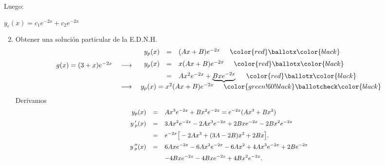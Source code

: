 \documentclass[9pt]{beamer}
\begin{document}
\begin{frame}[t]
	\begin{alertblock}{}
		Luego:
		\begin{center}
			\color{red} \underline{\color{black} \(y_c(x) = c_1e^{-2x} + c_2e^{-2x}\)}
		\end{center}
		\begin{enumerate}
			\setcounter{enumi}{1}
			\item Obtener una solución particular de la E.D.N.H.
				\[
					\begin{array}{rcl}
						g(x) = (3+x) e^{-2x} & \; \longrightarrow\; & \begin{array}{rcl}
							y_p(x) & = & (Ax+B) e^{-2x} \hspace{5mm} \color{red} \ballotx \color{black} \\[2mm]
							y_p(x) & = & x(Ax+B) e^{-2x} \hspace{5mm} \color{red} \ballotx \color{black} \\[2mm]
							& = & Ax^2e^{-2x} + \underbrace{Bxe^{-2x}} \hspace{5mm} \color{red} \ballotx \color{black}
						\end{array} \\[2mm]
						& \; \longrightarrow\; & y_p(x) = x^{2} (Ax+B) e^{-2x} \hspace{5mm} \color{green!60!black} \ballotcheck \color{black}
					\end{array} \vspace{-3mm}
				\]
				Derivamos
				\[
					\small
					\begin{array}{rcl}
						y_p(x) & = & Ax^3e^{-2x} +Bx^2e^{-2x} = e^{-2x} (Ax^3+Bx^2) \\[2mm]
						y\,'_p(x) & = & 3Ax^2e^{-2x} -2Ax^3e^{-2x} +2Bxe^{-2x} -2Bx^2e^{-2x} \\[2mm]
						& = & e^{-2x} \big[-2Ax^3+(3A-2B) x^2+2Bx\big] . \\[2mm]
						y\,'' _p(x) & = & 6Axe^{-2x} -6Ax^2e^{-2x} -6Ax^2 + 4Ax^3e^{-2x} +2Be^{-2x} \\[2mm]
						&& -4Bxe^{-2x} -4Bxe^{-2x} + 4Bx^2e^{-2x}.
					\end{array}
				\]
		\end{enumerate}
	\end{alertblock}
\end{frame}
\end{document}
